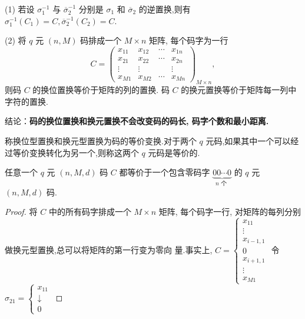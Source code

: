 \begin{remark}

    (1) 若设 $ \sigma_{1}^{-1} $ 与 $ \overline{\sigma}_{2}^{-1} $ 分别是 $ \sigma_{1} $ 和 $ \overline{\sigma}_{2} $ 的逆置换,则有 $ \sigma_{1}^{-1}\left(C_{1}\right)=C, \overline{\sigma}_{2}^{-1}\left(C_{2}\right)=C $.
    
(2) 将 $ q $ 元 $ (n, M) $ 码排成一个 $ M \times n $ 矩阵, 每个码字为一行
$$
C=\left(\begin{array}{cccc}
x_{11} & x_{12} & \cdots & x_{1 n} \\
x_{21} & x_{22} & \cdots & x_{2 n} \\
\vdots & \vdots & & \vdots \\
x_{M 1} & x_{M 2} & \cdots & x_{M n}
\end{array}\right)_{M \times n},
$$
则码 $ C $ 的换位置换等价于矩阵的列的置换. 码 $ C $ 的换元置换等价于矩阵每一列中字符的置换.
\end{remark}

结论：\textbf{码的换位置换和换元置换不会改变码的码长, 码字个数和最小距离.}

\begin{definition}
    称换位型置换和换元型置换为码的等价变换.对于两个 $ q $ 元码,如果其中一个可以经过等价变换转化为另一个,则称这两个 $ q $ 元码是等价的.
\end{definition}

\begin{lemma}
任意一个 $ q $ 元 $ (n, M, d) $ 码 $ C $ 都等价于一个包含零码字 $ \underbrace{00 \cdots 0}_{n \text { 个 }} $ 的 $ q $ 元 $ (n, M, d) $ 码.
\end{lemma}
\begin{proof}
将 $ C $ 中的所有码字排成一个 $ M \times n $ 矩阵, 每个码字一行, 对矩阵的每列分别做换元型置换,总可以将矩阵的第一行变为零向
量.事实上, $ C=\left\{\begin{array}{l}x_{11} \\ \vdots \\ x_{i-1,1} \\ 0 \\ x_{i+1,1} \\ \vdots \\ x_{M 1}\end{array}\right. $ 令 $ \sigma_{21}=\left\{\begin{array}{l}x_{11} \\ \downarrow \\ 0\end{array}\right. $
\end{proof}

